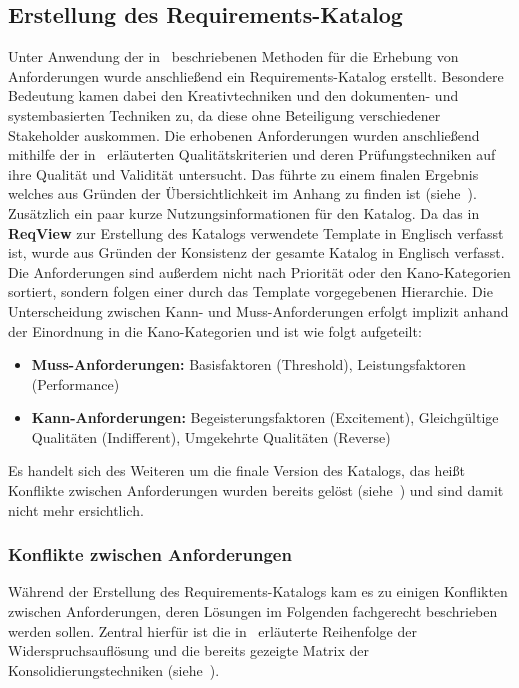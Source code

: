 \subsection{Erstellung des Requirements-Katalog}\label{subsec:requirements}
Unter Anwendung der in~ beschriebenen Methoden für die Erhebung von Anforderungen
wurde anschließend ein Requirements-Katalog erstellt.
Besondere Bedeutung kamen dabei den Kreativtechniken und den dokumenten- und systembasierten Techniken zu, da diese ohne
Beteiligung verschiedener Stakeholder auskommen.
Die erhobenen Anforderungen wurden anschließend mithilfe der in~
erläuterten Qualitätskriterien und deren Prüfungstechniken auf ihre Qualität und Validität untersucht.
Das führte zu einem finalen Ergebnis welches aus Gründen der Übersichtlichkeit im Anhang zu finden ist
(siehe~).
Zusätzlich ein paar kurze Nutzungsinformationen für den Katalog.
Da das in \textbf{ReqView} zur Erstellung des Katalogs verwendete Template in Englisch verfasst ist, wurde aus Gründen
der Konsistenz der gesamte Katalog in Englisch verfasst.
Die Anforderungen sind außerdem nicht nach Priorität oder den Kano-Kategorien sortiert, sondern folgen einer durch das
Template vorgegebenen Hierarchie.
Die Unterscheidung zwischen Kann- und Muss-Anforderungen erfolgt implizit anhand der Einordnung in die Kano-Kategorien und
ist wie folgt aufgeteilt:

\begin{itemize}
    \item \textbf{Muss-Anforderungen:} Basisfaktoren (Threshold), Leistungsfaktoren (Performance)
    \item \textbf{Kann-Anforderungen:} Begeisterungsfaktoren (Excitement), Gleichgültige Qualitäten (Indifferent),
    Umgekehrte Qualitäten (Reverse)
\end{itemize}

Es handelt sich des Weiteren um die finale Version des Katalogs, das heißt Konflikte zwischen Anforderungen wurden bereits
gelöst (siehe~) und sind damit nicht mehr ersichtlich.

\subsubsection{Konflikte zwischen Anforderungen}\label{subsubsec:conflicts}
Während der Erstellung des Requirements-Katalogs kam es zu einigen Konflikten zwischen Anforderungen, deren Lösungen im Folgenden
fachgerecht beschrieben werden sollen.
Zentral hierfür ist die in~ erläuterte Reihenfolge der Widerspruchsauflösung und die bereits
gezeigte Matrix der Konsolidierungstechniken (siehe~).

